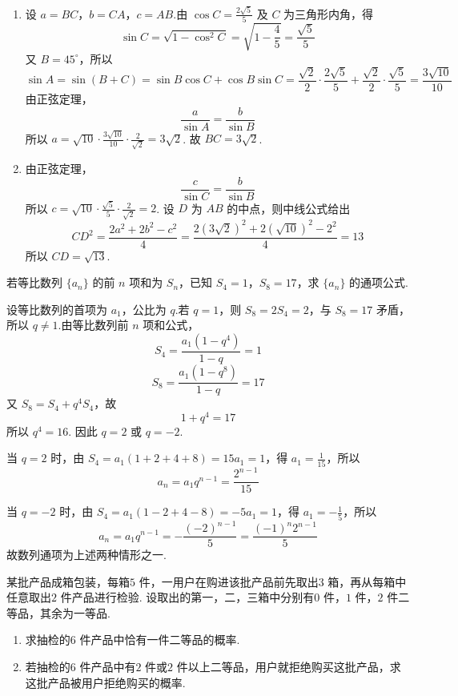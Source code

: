 \begin{solution}
\begin{enumerate}
\item 设 \(a=BC\)，\(b=CA\)，\(c=AB\).由 \(\cos C=\frac{2\sqrt5}{5}\) 及 \(C\) 为三角形内角，得
\[
\sin C=\sqrt{1-\cos^{2}C}=\sqrt{1-\frac45}=\frac{\sqrt5}{5}
\]
又 \(B=45^{\circ}\)，所以
\[
\sin A=\sin(B+C)=\sin B\cos C+\cos B\sin C
=\frac{\sqrt2}{2}\cdot\frac{2\sqrt5}{5}+\frac{\sqrt2}{2}\cdot\frac{\sqrt5}{5}
=\frac{3\sqrt{10}}{10}
\]
由正弦定理，
\[
\frac{a}{\sin A}=\frac{b}{\sin B}
\]
所以 \(a=\sqrt{10}\cdot\frac{3\sqrt{10}}{10}\cdot\frac{2}{\sqrt2}=3\sqrt2\).
故 \(BC=3\sqrt2\).

\item 由正弦定理，
\[
\frac{c}{\sin C}=\frac{b}{\sin B}
\]
所以 \(c=\sqrt{10}\cdot\frac{\sqrt5}{5}\cdot\frac{2}{\sqrt2}=2\).
设 \(D\) 为 \(AB\) 的中点，则中线公式给出
\[
CD^{2}=\frac{2a^{2}+2b^{2}-c^{2}}{4}
=\frac{2(3\sqrt2)^{2}+2(\sqrt{10})^{2}-2^{2}}{4}
=13
\]
所以 \(CD=\sqrt{13}\).
\end{enumerate}
\end{solution}

\begin{problem}
若等比数列 \(\{a_{n}\}\) 的前 \(n\) 项和为 \(S_{n}\)，已知 \(S_{4} = 1\)，\(S_{8} = 17\)，求 \(\{a_{n}\}\) 的通项公式.
\end{problem}

\begin{solution}
设等比数列的首项为 \(a_1\)，公比为 \(q\).若 \(q=1\)，则 \(S_8=2S_4=2\)，与 \(S_8=17\) 矛盾，所以 \(q\ne1\).由等比数列前 \(n\) 项和公式，
\[
S_4=\frac{a_1(1-q^4)}{1-q}=1
\]
\[
S_8=\frac{a_1(1-q^8)}{1-q}=17
\]
又 \(S_8=S_4+q^4S_4\)，故
\[
1+q^4=17
\]
所以 \(q^4=16\).
因此 \(q=2\) 或 \(q=-2\).

当 \(q=2\) 时，由 \(S_4=a_1(1+2+4+8)=15a_1=1\)，得 \(a_1=\frac1{15}\)，所以
\[
a_n=a_1q^{n-1}=\frac{2^{n-1}}{15}
\]

当 \(q=-2\) 时，由 \(S_4=a_1(1-2+4-8)=-5a_1=1\)，得 \(a_1=-\frac15\)，所以
\[
a_n=a_1q^{n-1}=-\frac{(-2)^{n-1}}5=\frac{(-1)^n2^{n-1}}5
\]
故数列通项为上述两种情形之一.
\end{solution}

\begin{problem}
某批产品成箱包装，每箱\(5\text{ 件}\)，一用户在购进该批产品前先取出\(3\text{ 箱}\)，再从每箱中任意取出\(2\text{ 件}\)产品进行检验. 设取出的第一，二，三箱中分别有\(0\text{ 件}\)，\(1\text{ 件}\)，\(2\text{ 件}\)二等品，其余为一等品.

\begin{enumerate}
\item 求抽检的\(6\text{ 件}\)产品中恰有一件二等品的概率.
\item 若抽检的\(6\text{ 件}\)产品中有\(2\text{ 件}\)或\(2\text{ 件以上}\)二等品，用户就拒绝购买这批产品，求这批产品被用户拒绝购买的概率.
\end{enumerate}
\end{problem}

